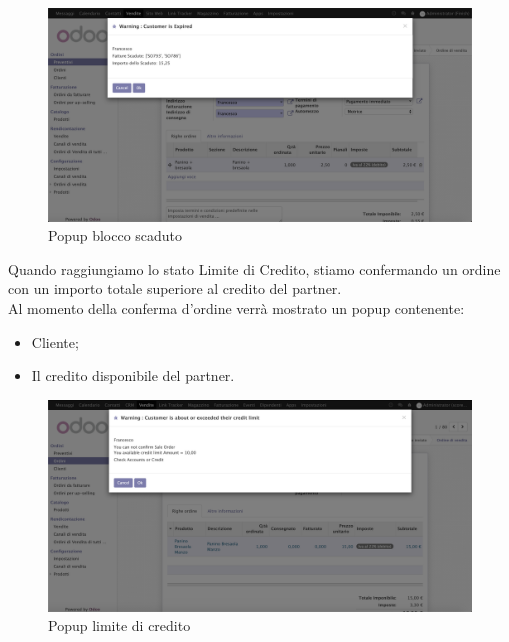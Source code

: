 \vspace*{1.5cm}
\begin{figure}[H]
	\begin{center} \includegraphics[scale=0.3]{figures/check_expired}
		\caption[Popup blocco scaduto]{Popup blocco scaduto}
		\label{fig:check_expired}
	\end{center}
\end{figure}
\newpage
Quando raggiungiamo lo stato Limite di Credito, stiamo confermando un ordine con un importo totale superiore al credito del partner.\\
Al momento della conferma d'ordine verrà mostrato un popup contenente:
\begin{itemize}
	\item Cliente;
	\item Il credito disponibile del partner.
\end{itemize}

\begin{figure}[H]
	\begin{center} \includegraphics[scale=0.3]{figures/check_limit}
		\caption[Popup limite di credito]{Popup limite di credito}
		\label{fig:check_limit}
	\end{center}
\end{figure}

